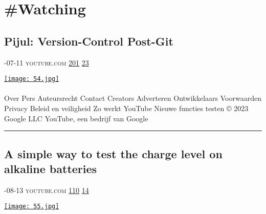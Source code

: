 \documentclass[10pt,a4paper]{article}
\begin{document}
\newpage
\section{\#Watching}

\begin{multicols*}{2}

\noindent\begin{minipage}{\linewidth}
\subsection{Pijul: Version-Control Post-Git}
\textsc{\footnotesize
{\scriptsize\faCalendar}-07-11 
{\scriptsize\faYoutube}\space 
youtube.com 
{\scriptsize\faThumbsOUp}\space 
\href{http://news.ycombinator.com/item?id=37094599\&utm\_term=comment}{201} 
{\scriptsize\faComments}\space 
\href{http://news.ycombinator.com/item?id=37094599\&utm\_term=comment}{23} 
}
\par\medskip\noindent
\href{https://www.youtube.com/watch?v=7MpdZkGj5AI\&utm\_source=hackernewsletter\&utm\_medium=email\&utm\_term=watching}{
    \texttt{[image: 54.jpg]}
}
\end{minipage}
\paragraph{}
Over
Pers
Auteursrecht
Contact
Creators
Adverteren
Ontwikkelaars
Voorwaarden
Privacy
Beleid en veiligheid
Zo werkt YouTube
Nieuwe functies testen
© 2023 Google LLC
YouTube, een bedrijf van Google
\par\noindent\textcolor{red}{\rule{\linewidth}{0.2mm}}
\vfill
\null
\noindent\begin{minipage}{\linewidth}
\subsection{A simple way to test the charge level on alkaline batteries}
\textsc{\footnotesize
{\scriptsize\faCalendar}-08-13 
{\scriptsize\faYoutube}\space 
youtube.com 
{\scriptsize\faThumbsOUp}\space 
\href{http://news.ycombinator.com/item?id=37155657\&utm\_term=comment}{110} 
{\scriptsize\faComments}\space 
\href{http://news.ycombinator.com/item?id=37155657\&utm\_term=comment}{14} 
}
\par\medskip\noindent
\href{https://www.youtube.com/watch?v=nwfFBUVxpac\&utm\_source=hackernewsletter\&utm\_medium=email\&utm\_term=watching}{
    \texttt{[image: 55.jpg]}
}
\end{minipage}

\end{multicols*}
\end{document}
